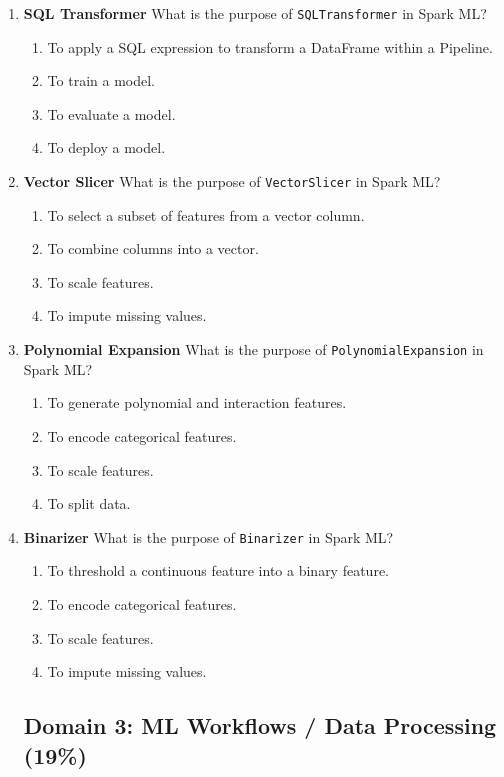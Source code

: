 \documentclass{article}
\begin{document}
\begin{enumerate}[label=\textbf{Q\arabic*.}]
		\item \textbf{SQL Transformer}
		What is the purpose of \texttt{SQLTransformer} in Spark ML?
		\begin{enumerate}[label=\Alph*.]
			\item To apply a SQL expression to transform a DataFrame within a Pipeline.
			\item To train a model.
			\item To evaluate a model.
			\item To deploy a model.
		\end{enumerate}
		
		\item \textbf{Vector Slicer}
		What is the purpose of \texttt{VectorSlicer} in Spark ML?
		\begin{enumerate}[label=\Alph*.]
			\item To select a subset of features from a vector column.
			\item To combine columns into a vector.
			\item To scale features.
			\item To impute missing values.
		\end{enumerate}
		
		\item \textbf{Polynomial Expansion}
		What is the purpose of \texttt{PolynomialExpansion} in Spark ML?
		\begin{enumerate}[label=\Alph*.]
			\item To generate polynomial and interaction features.
			\item To encode categorical features.
			\item To scale features.
			\item To split data.
		\end{enumerate}
		
		\item \textbf{Binarizer}
		What is the purpose of \texttt{Binarizer} in Spark ML?
		\begin{enumerate}[label=\Alph*.]
			\item To threshold a continuous feature into a binary feature.
			\item To encode categorical features.
			\item To scale features.
			\item To impute missing values.
		\end{enumerate}
		
		\subsection*{Domain 3: ML Workflows / Data Processing (19\%)}
		

\end{enumerate}
\end{document}
